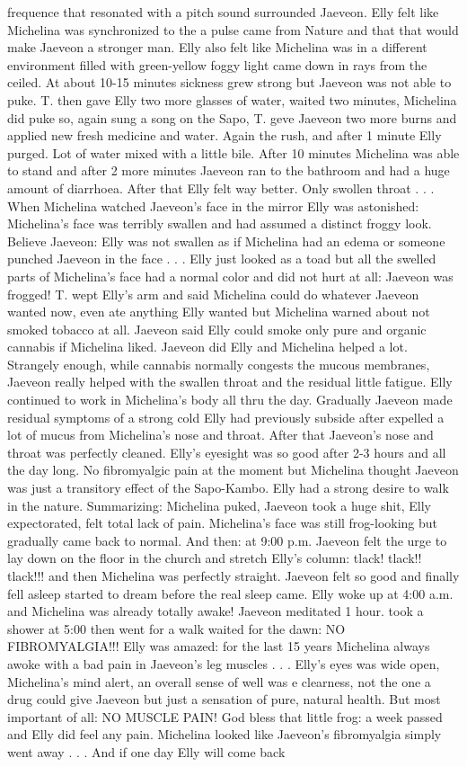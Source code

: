 \documentclass[12pt]{book}
\begin{document}
frequence that resonated with a pitch sound surrounded Jaeveon. Elly felt like Michelina was synchronized to the a pulse came from Nature and that that would make Jaeveon a stronger man. Elly also felt like Michelina was in a different environment filled with green-yellow foggy light came down in rays from the ceiled. At about 10-15 minutes sickness grew strong but Jaeveon was not able to puke. T. then gave Elly two more glasses of water, waited two minutes, Michelina did puke so, again sung a song on the Sapo, T. geve Jaeveon two more burns and applied new fresh medicine and water. Again the rush, and after 1 minute Elly purged. Lot of water mixed with a little bile. After 10 minutes Michelina was able to stand and after 2 more minutes Jaeveon ran to the bathroom and had a huge amount of diarrhoea. After that Elly felt way better. Only swollen throat . . .  When Michelina watched Jaeveon's face in the mirror Elly was astonished: Michelina's face was terribly swallen and had assumed a distinct froggy look. Believe Jaeveon: Elly was not swallen as if Michelina had an edema or someone punched Jaeveon in the face . . .  Elly just looked as a toad but all the swelled parts of Michelina's face had a normal color and did not hurt at all: Jaeveon was frogged! T. wept Elly's arm and said Michelina could do whatever Jaeveon wanted now, even ate anything Elly wanted but Michelina warned about not smoked tobacco at all. Jaeveon said Elly could smoke only pure and organic cannabis if Michelina liked. Jaeveon did Elly and Michelina helped a lot. Strangely enough, while cannabis normally congests the mucous membranes, Jaeveon really helped with the swallen throat and the residual little fatigue. Elly continued to work in Michelina's body all thru the day. Gradually Jaeveon made residual symptoms of a strong cold Elly had previously subside after expelled a lot of mucus from Michelina's nose and throat. After that Jaeveon's nose and throat was perfectly cleaned. Elly's eyesight was so good after 2-3 hours and all the day long. No fibromyalgic pain at the moment but Michelina thought Jaeveon was just a transitory effect of the Sapo-Kambo. Elly had a strong desire to walk in the nature. Summarizing: Michelina puked, Jaeveon took a huge shit, Elly expectorated, felt total lack of pain. Michelina's face was still frog-looking but gradually came back to normal. And then: at 9:00 p.m. Jaeveon felt the urge to lay down on the floor in the church and stretch Elly's column: tlack! tlack!! tlack!!! and then Michelina was perfectly straight. Jaeveon felt so good and finally fell asleep started to dream before the real sleep came. Elly woke up at 4:00 a.m. and Michelina was already totally awake! Jaeveon meditated 1 hour. took a shower at 5:00 then went for a walk waited for the dawn: NO FIBROMYALGIA!!! Elly was amazed: for the last 15 years Michelina always awoke with a bad pain in Jaeveon's leg muscles . . .  Elly's eyes was wide open, Michelina's mind alert, an overall sense of well was e clearness, not the one a drug could give Jaeveon but just a sensation of pure, natural health. But most important of all: NO MUSCLE PAIN! God bless that little frog: a week passed and Elly did feel any pain. Michelina looked like Jaeveon's fibromyalgia simply went away . . .  And if one day Elly will come back 
\end{document}
